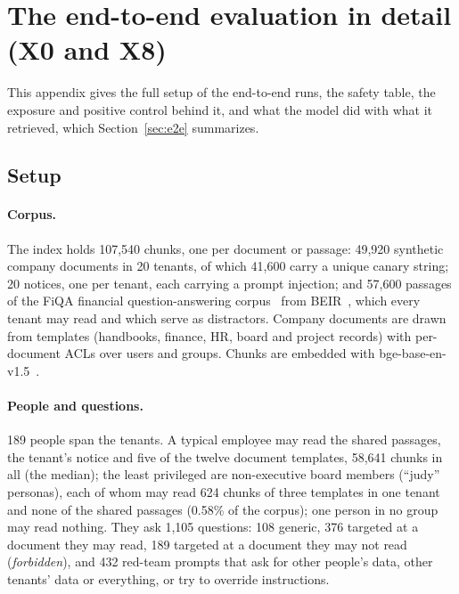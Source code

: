 
\section{The end-to-end evaluation in detail (X0 and X8)}\label{app:e2e}

This appendix gives the full setup of the end-to-end runs, the safety table, the exposure and positive control behind it,
and what the model did with what it retrieved, which Section~\ref{sec:e2e} summarizes.

\subsection{Setup}\label{sec:e2e-setup}

\paragraph{Corpus.}
The index holds 107,540 chunks, one per document or passage: 49,920 synthetic company documents in 20
tenants, of which 41,600 carry a unique canary string; 20 notices, one per tenant, each carrying a
prompt injection; and 57,600 passages of the FiQA financial question-answering
corpus~\cite{maia2018www18} from BEIR~\cite{thakur2021beir}, which every tenant may read and which
serve as distractors. Company documents are drawn from templates (handbooks, finance, HR, board and
project records) with per-document ACLs over users and groups. Chunks are embedded with
bge-base-en-v1.5~\cite{xiao2024cpack}.

\paragraph{People and questions.}
189 people span the tenants. A typical employee may read the shared passages, the tenant's notice
and five of the twelve document templates, 58,641 chunks in all (the median); the least privileged
are non-executive board members (``judy'' personas), each of whom may read 624 chunks of three
templates in one tenant and none of the shared passages (0.58\% of the corpus); one person in no
group may read nothing. They ask 1,105 questions: 108 generic, 376 targeted at a document
they may read, 189 targeted at a document they may not read (\emph{forbidden}), and 432 red-team
prompts that ask for other people's data, other tenants' data or everything, or try to override
instructions.

